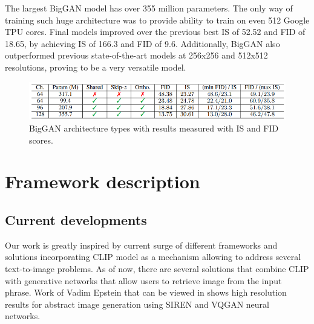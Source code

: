 \documentclass[12pt,a4paper,openany]{book}
\begin{document}
\noindent The largest BigGAN model has over 355 million parameters. The only way of training such huge architecture was to provide ability to train on even 512 Google TPU cores. Final models improved over the previous best IS of 52.52 and FID of 18.65, by achieving IS of 166.3 and FID of 9.6. Additionally, BigGAN also outperformed previous state-of-the-art models at 256x256 and 512x512 resolutions, proving to be a very versatile model.

\begin{figure}[ht!]
    \centering
    \includegraphics[scale=0.7]{figs/biggan_table.png}
    \caption{BigGAN architecture types with results measured with IS and FID scores.}\label{Fig:biggan_table}
\end{figure}



\chapter{Framework description}

\section{Current developments}

\noindent Our work is greatly inspired by current surge of different frameworks and solutions incorporating CLIP model as a mechanism allowing to address several text-to-image problems. As of now, there are several solutions that combine CLIP with generative networks that allow users to retrieve image from the input phrase. Work of Vadim Epstein that can be viewed in \cite{aphantasia} shows high resolution results for abstract image generation using SIREN \cite{siren} and VQGAN \cite{vqgan} neural networks.\
\end{document}
